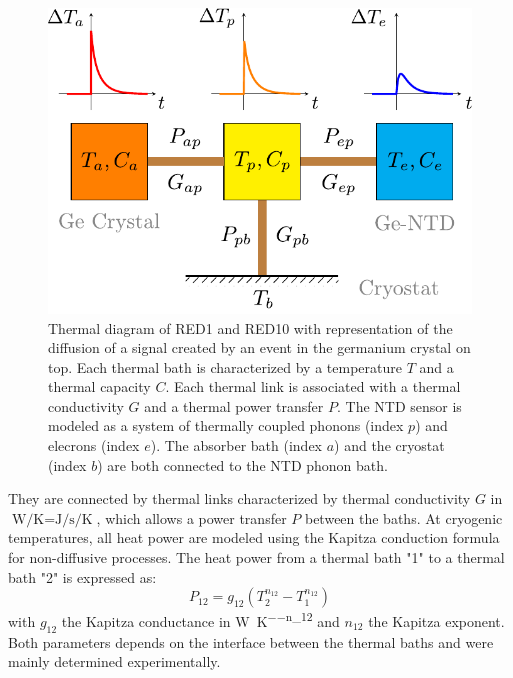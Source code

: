 \begin{figure}
\begin{center}
\includegraphics[scale=1]{Figures/Ethem/thermal_scheme.pdf}
\end{center}
\caption{Thermal diagram of RED1 and RED10 with representation of the diffusion of a signal created by an event in the germanium crystal on top. Each thermal bath is characterized by a temperature $T$ and a thermal capacity $C$. Each thermal link is associated with a thermal conductivity $G$ and a thermal power transfer $P$. The NTD sensor is modeled as a system of thermally coupled phonons (index $p$) and elecrons (index $e$). The absorber bath (index $a$) and the cryostat (index $b$) are both connected to the NTD phonon bath.}
\label{fig:thermal-scheme}
\end{figure}

They are connected by thermal links characterized by thermal conductivity $G$ in $\si{\watt\per\kelvin}=\si{\joule\per\s\per\kelvin}$, which allows a power transfer $P$ between the baths.
At cryogenic temperatures, all heat power are modeled using the Kapitza conduction formula for non-diffusive processes.
The heat power from a thermal bath "1" to a thermal bath "2" is expressed as:
\begin{equation}
\label{eq:kaptiza-conduction}
P_{12} = g_{12} \left( T_2^{n_{12}} - T_1^{n_{12}}\right)
\end{equation}
with $g_{12}$ the Kapitza conductance in \si{\watt\per\kelvin^{-n_{12}}} and $n_{12}$ the Kapitza exponent. Both parameters depends on the interface between the thermal baths and were mainly determined experimentally.

